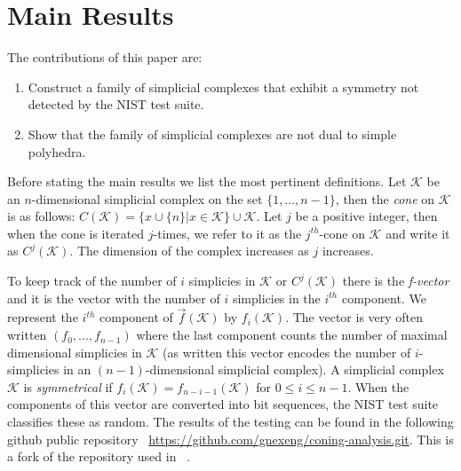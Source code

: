 \documentclass[oneside,12pt]{amsart}
\theoremstyle{definition}
\numberwithin{equation}{section}
\begin{document}
\section{Main Results}

The contributions of this paper are:\\[.2ex]
\begin{center}
\begin{enumerate}
  \item Construct a family of simplicial complexes that exhibit a symmetry not detected by the NIST test suite. \\[.8ex]
  \item Show that the family of simplicial complexes are not dual to simple polyhedra. \\
\end{enumerate}
\end{center}

Before stating the main results we list the most pertinent definitions.  Let $\mathcal{K}$ be an $n$-dimensional simplicial complex on the set $\{1,\ldots,n-1\}$, then the \textit{cone} on $\mathcal{K}$ is as follows: $C(\mathcal{K}) =   \{   x\cup \{n\}   |  x\in \mathcal{K}  \}  \cup \mathcal{K}$.  Let $j$ be a positive integer, then when the cone is iterated $j$-times, we refer to it as the $j^{th}$-cone on $\mathcal{K}$ and write it as $C^j(\mathcal{K})$.  The dimension of the complex increases as $j$ increases.

To keep track of the number of $i$ simplicies in $\mathcal{K}$ or $C^j(\mathcal{K})$ there is the \textit{f-vector} and it is the vector with the number of $i$ simplicies in the $i^{th}$ component.  We represent the $i^{th}$ component of $\overrightarrow{f}(\mathcal{K})$ by $f_{i}(\mathcal{K})$.  The vector is very often written $(f_0,...,f_{n-1})$ where the last component counts the number of maximal dimensional simplicies in $\mathcal{K}$ (as written this vector encodes the number of $i$-simplicies in an $(n-1)$-dimensional simplicial complex).  A simplicial complex $\mathcal{K}$ is \textit{symmetrical} if $f_i(\mathcal{K}) = f_{n-i-1}(\mathcal{K})$ for $0 \leq i \leq n-1$.  When the components of this vector are converted into bit sequences, the NIST test suite classifies these as random. The results of the testing can be found in the following github public repository ~\url{https://github.com/gnexeng/coning-analysis.git}. This is a fork of the repository used in ~\cite{ALDH}. %
\end{document}
